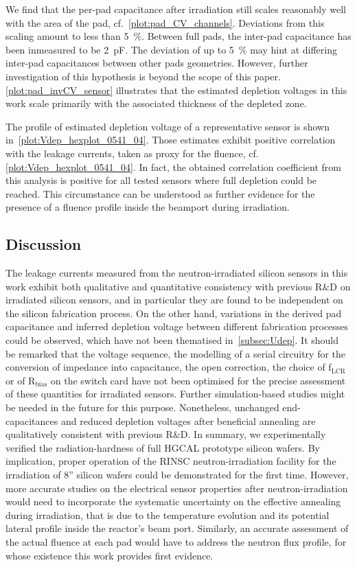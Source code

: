 We find that the per-pad capacitance after irradiation still scales reasonably well with the area of the pad, cf.~\ref{plot:pad_CV_channels}.
Deviations from this scaling amount to less than \SI{5}{\percent}.
Between full pads, the inter-pad capacitance has been inmeasured to be \SI{2}{\pico\farad}.
The deviation of up to \SI{5}{\percent} may hint at differing inter-pad capacitances between other pads geometries.
However, further investigation of this hypothesis is beyond the scope of this paper. 
\ref{plot:pad_invCV_sensor} illustrates that the estimated depletion voltages in this work scale primarily with the associated thickness of the depleted zone. 

The profile of estimated depletion voltage of a representative sensor is shown in~\ref{plot:Vdep_hexplot_0541_04}.
Those estimates exhibit positive correlation with the leakage currents, taken as proxy for the fluence, cf. \ref{plot:Vdep_hexplot_0541_04}.
In fact, the obtained correlation coefficient from this analysis is positive for all tested sensors where full depletion could be reached.
This circumstance can be understood as further evidence for the presence of a fluence profile inside the beamport during irradiation.

\subsection{Discussion}
\label{subsec:discussion}
The leakage currents measured from the neutron-irradiated silicon sensors in this work exhibit both qualitative and quantitative consistency with previous R$\&$D on irradiated silicon sensors, and in particular they are found to be independent on the silicon fabrication process.
On the other hand, variations in the derived pad capacitance and inferred depletion voltage between different fabrication processes could be observed, which have not been thematised in~\ref{subsec:Udep}. 
It should be remarked that the voltage sequence, the modelling of a serial circuitry for the conversion of impedance into capacitance, the open correction, the choice of f$_\text{LCR}$ or of R$_\text{bias}$ on the switch card have not been optimised for the precise assessment of these quantities for irradiated sensors.
Further simulation-based studies might be needed in the future for this purpose.
Nonetheless, unchanged end-capacitances and reduced depletion voltages after beneficial annealing are qualitatively consistent with previous R$\&$D.
In summary, we experimentally verified the radiation-hardness of full HGCAL prototype silicon wafers.
By implication, proper operation of the RINSC neutron-irradiation facility for the irradiation of 8'' silicon wafers could be demonstrated for the first time.
However, more accurate studies on the electrical sensor properties after neutron-irradiation would need to incorporate the systematic uncertainty on the effective annealing during irradiation, that is due to the temperature evolution and its potential lateral profile inside the reactor's beam port.
Similarly, an accurate assessment of the actual fluence at each pad would have to address the neutron flux profile, for whose existence this work provides first evidence.